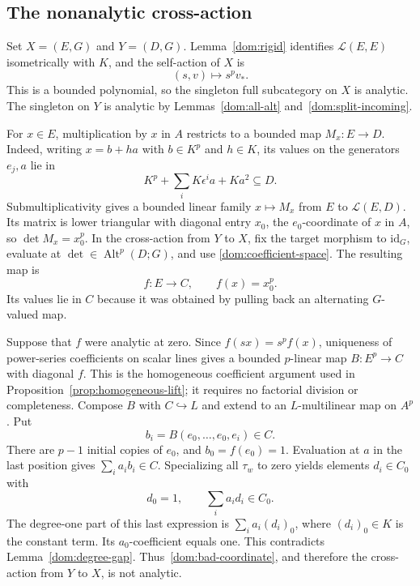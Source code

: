 \documentclass[11pt]{amsart}
\theoremstyle{definition}
\theoremstyle{remark}
\numberwithin{equation}{section}
\newcommand{\cL}{\mathcal L}
\newcommand{\Alt}{\operatorname{Alt}}
\newcommand{\id}{\mathrm{id}}
\begin{document}
\subsection{The nonanalytic cross-action}

Set $X=(E,G)$ and $Y=(D,G)$. Lemma~\ref{dom:rigid} identifies $\cL(E,E)$ isometrically with $K$,
and the self-action of $X$ is
\[
(s,v)\longmapsto s^p v_*.
\]
This is a bounded polynomial, so the singleton full subcategory on $X$ is analytic. The singleton on $Y$
is analytic by Lemmas~\ref{dom:all-alt} and~\ref{dom:split-incoming}.

For $x\in E$, multiplication by $x$ in $A$ restricts to a bounded map $M_x\colon E\to D$.
Indeed, writing $x=b+ha$ with $b\in K^p$ and $h\in K$, its values on the generators $e_j,a$ lie in
\[
K^p+\sum_iK\epsilon^ia+Ka^2\subseteq D.
\]
Submultiplicativity gives a bounded linear family $x\mapsto M_x$ from $E$ to $\cL(E,D)$.
Its matrix is lower triangular with diagonal entry $x_0$, the $e_0$\nobreakdash-coordinate of $x$ in $A$, so $\det M_x=x_0^p$. In the cross-action from
$Y$ to $X$, fix the target morphism to $\id_G$, evaluate at $\det\in\Alt^p(D;G)$, and use
\eqref{dom:coefficient-space}. The resulting map is
\begin{equation}\label{dom:bad-coordinate}
f\colon E\longrightarrow C,\qquad f(x)=x_0^p.
\end{equation}
Its values lie in $C$ because it was obtained by pulling back an alternating $G$\nobreakdash-valued map.

Suppose that $f$ were analytic at zero. Since $f(sx)=s^pf(x)$, uniqueness of power-series coefficients
on scalar lines gives a bounded $p$\nobreakdash-linear map $B\colon E^p\to C$ with diagonal $f$.
This is the homogeneous coefficient argument used in Proposition~\ref{prop:homogeneous-lift}; it requires no factorial
division or completeness. Compose $B$ with $C\hookrightarrow L$ and extend to an $L$\nobreakdash-multilinear
map on $A^p$. Put
\[
b_i=B(e_0,\ldots,e_0,e_i)\in C.
\]
There are $p-1$ initial copies of $e_0$, and $b_0=f(e_0)=1$. Evaluation at $a$ in the last position gives
$\sum_i a_i b_i\in C$. Specializing all $\tau_w$ to zero yields elements $d_i\in C_0$ with
\[
d_0=1,\qquad \sum_i a_i d_i\in C_0.
\]
The degree-one part of this last expression is $\sum_i a_i(d_i)_0$, where $(d_i)_0\in K$ is the
constant term. Its $a_0$\nobreakdash-coefficient equals one. This contradicts Lemma~\ref{dom:degree-gap}.
Thus~\eqref{dom:bad-coordinate}, and therefore the cross-action from $Y$ to $X$, is not analytic.
\end{document}
